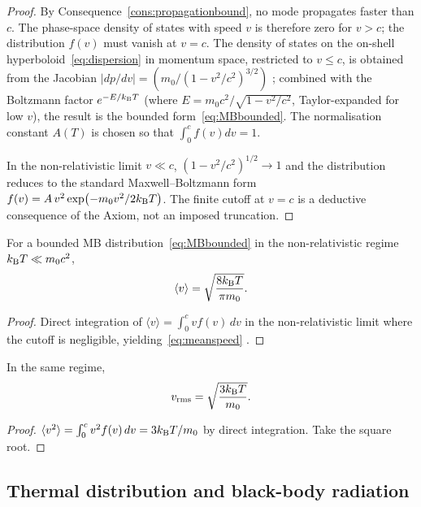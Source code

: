 \begin{proof}
By Consequence~\ref{cons:propagationbound}, no mode propagates faster than $c$. The phase-space density of states with speed $v$ is therefore zero for $v>c$; the distribution $f(v)$ must vanish at $v=c$. The density of states on the on-shell hyperboloid~\eqref{eq:dispersion} in momentum space, restricted to $v\le c$, is obtained from the Jacobian $|dp/dv|=(m_{0}/(1-v^{2}/c^{2})^{3/2})$ \citep{griffiths2018}; combined with the Boltzmann factor $e^{-E/k_{\mathrm{B}} T}$ (where $E=m_{0}c^{2}/\sqrt{1-v^{2}/c^{2}}$, Taylor-expanded for low $v$), the result is the bounded form~\eqref{eq:MBbounded}. The normalisation constant $A(T)$ is chosen so that $\int_{0}^{c}f(v)dv=1$.

In the non-relativistic limit $v\ll c$, $(1-v^{2}/c^{2})^{1/2}\to 1$ and the distribution reduces to the standard Maxwell--Boltzmann form $f(v)=A\,v^{2}\exp(-m_{0}v^{2}/2k_{\mathrm{B}} T)$. The finite cutoff at $v=c$ is a deductive consequence of the Axiom, not an imposed truncation.
\end{proof}

\begin{proposition}
\label{prop:meanspeed}
For a bounded MB distribution~\eqref{eq:MBbounded} in the non-relativistic regime $k_{\mathrm{B}} T\ll m_{0}c^{2}$,
\begin{equation}
\langle v\rangle=\sqrt{\frac{8k_{\mathrm{B}} T}{\pi m_{0}}}.
\label{eq:meanspeed}
\end{equation}
\end{proposition}

\begin{proof}
Direct integration of $\langle v\rangle=\int_{0}^{c}v f(v)\,dv$ in the non-relativistic limit where the cutoff is negligible, yielding~\eqref{eq:meanspeed} \citep{landaulifshitz5}.
\end{proof}

\begin{proposition}
\label{prop:rmsspeed}
In the same regime,
\begin{equation}
v_{\mathrm{rms}}=\sqrt{\frac{3k_{\mathrm{B}} T}{m_{0}}}.
\label{eq:rmsspeed}
\end{equation}
\end{proposition}

\begin{proof}
$\langle v^{2}\rangle=\int_{0}^{c}v^{2}f(v)\,dv=3k_{\mathrm{B}} T/m_{0}$ by direct integration. Take the square root.
\end{proof}

\subsection{Thermal distribution and black-body radiation}

